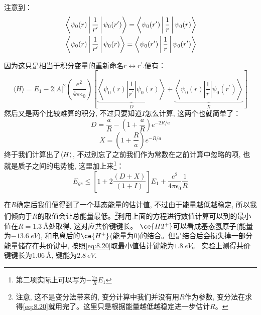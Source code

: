 \documentclass[a4paper,zihao=-4,linespread=1]{ctexrep}
\begin{document}
    注意到：
    \begin{equation}
        \label{eq:8.17}
        \begin{aligned}
            &\Braket{\psi_0(r)|\frac{1}{r^\prime}|\psi_0(r^\prime)}=\Braket{\psi_0(r^\prime)|\frac{1}{r}|\psi_0(r)}\\
            &\Braket{\psi_0(r)|\frac{1}{r^\prime}|\psi_0(r)}=\Braket{\psi_0(r^\prime)|\frac{1}{r}|\psi_0(r^\prime)}
        \end{aligned}
    \end{equation}
    
    因为这只是相当于积分变量的重新命名$r\leftrightarrow r^\prime$.便有：
    \begin{equation*}
        \langle H\rangle=E_{1}-2|A|^{2}\left(\frac{e^{2}}{4 \pi \epsilon_{0}}\right)\left[\underbrace{\left\langle\psi_{0}(r)\left|\frac{1}{r^{\prime}}\right| \psi_{0}(r)\right\rangle}_D+\underbrace{ \left\langle\psi_{0}(r)\left|\frac{1}{r}\right| \psi_{0}\left(r^{\prime}\right)\right\rangle}_X\right]
    \end{equation*}
    然后又是两个比较难算的积分, 不过只要知道$I$怎么计算, 这两个也就简单了：
    \begin{equation}
        \label{eq:8.18}
        D=\frac{a}{R}-\left(1+\frac{a}{R}\right) e^{-2 R / a}
    \end{equation}
    \begin{equation}
        \label{eq:8.19}
        X=\left(1+\frac{R}{a}\right) e^{-R / a}
    \end{equation}
    终于我们计算出了$\braket{H}$, 不过别忘了之前我们作为常数在之前计算中忽略的项, 也就是质子之间的电势能, 这里加上来\footnote{第二项实际上可以写为$-\frac{2a}{R}E_1$}：
    \begin{equation}
        \label{eq:8.20}
        E_{gs}\leq\left[1+2 \frac{(D+X)}{(1+I)}\right] E_{1}+\frac{e^{2}}{4 \pi \epsilon_{0}} \frac{1}{R}
    \end{equation}
    
    在$R$确定后我们便得到了一个基态能量的估计值, 不过由于能量越低越稳定, 所以我们倾向于$R$的取值会让总能量最低。\footnote{注意, 这不是变分法带来的, 变分计算中我们并没有用$R$作为参数, 
    变分法在求得\ref{eq:8.20}就用完了。这里只是根据能量越低越稳定进一步估计$R$。}利用上面的方程进行数值计算可以到的最小值在$R=\SI[]{1.3}{\angstrom}$处取得, 这对应共价键键长。
    $\ce{H2^+}$可以看成基态氢原子(能量为$\SI[]{-13.6}{eV}$), 和电离后的$\ce{H^+}$(能量为0)的结合。但是结合后会损失掉一部分能量储存在共价键中, 按照\ref{eq:8.20}取最小值估计键能为$\SI[]{1.8}{eV}$。
    实验上测得共价键键长为$\SI[]{1.06}{\angstrom}$, 键能为$\SI[]{2.8}{eV}$.
    
\end{document}
